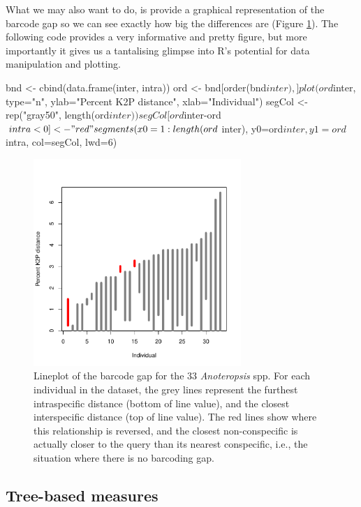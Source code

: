\documentclass{article}
\begin{document}
What we may also want to do, is provide a graphical representation of the barcode gap so we can see exactly how big the differences are (Figure \ref{barcode_gap.fig}). The following code provides a very informative and pretty figure, but more importantly it gives us a tantalising glimpse into R's potential for data manipulation and plotting. 

\begin{console}
bnd <- cbind(data.frame(inter, intra))
ord <- bnd[order(bnd$inter),]
plot(ord$inter, type="n", ylab="Percent K2P distance", xlab="Individual")
segCol <- rep("gray50", length(ord$inter))
segCol[ord$inter-ord$intra < 0] <- "red"
segments(x0=1:length(ord$inter), y0=ord$inter, y1=ord$intra, col=segCol, lwd=6)
\end{console}

\begin{figure}[p]
	\centering
	\includegraphics[width=0.7\textwidth,trim= 3cm 0cm 3cm 0cm]{barcode_gap}
	\caption{Lineplot of the barcode gap for the 33 \emph{Anoteropsis} spp. For each individual in the dataset, the grey lines represent the furthest intraspecific distance (bottom of line value), and the closest interspecific distance (top of line value). The red lines show where this relationship is reversed, and the closest non-conspecific is actually closer to the query than its nearest conspecific, i.e., the situation where there is no barcoding gap.}
	\label{barcode_gap.fig}
\end{figure}

\subsection{Tree-based measures}
\end{document}
